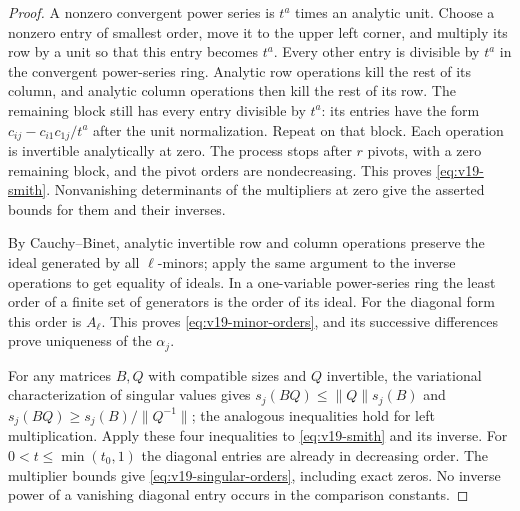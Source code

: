 \begin{proof}
A nonzero convergent power series is $t^a$ times an analytic unit.
Choose a nonzero entry of smallest order, move it to the upper left
corner, and multiply its row by a unit so that this entry becomes
$t^a$. Every other entry is divisible by $t^a$ in the convergent
power-series ring. Analytic row operations kill the rest of its
column, and analytic column operations then kill the rest of its row.
The remaining block still has every entry divisible by $t^a$:
its entries have the form $c_{ij}-c_{i1}c_{1j}/t^a$ after the unit
normalization. Repeat on that block. Each operation is invertible
analytically at zero. The process stops after $r$ pivots, with a zero
remaining block, and the pivot orders are nondecreasing. This proves
\eqref{eq:v19-smith}. Nonvanishing determinants of the multipliers
at zero give the asserted bounds for them and their inverses.

By Cauchy--Binet, analytic invertible row and column operations
preserve the ideal generated by all $\ell$-minors; apply the same
argument to the inverse operations to get equality of ideals.
In a one-variable power-series ring the least order of a finite
set of generators is the order of its ideal. For the diagonal form
this order is $A_\ell$. This proves \eqref{eq:v19-minor-orders},
and its successive differences prove uniqueness of the $\alpha_j$.

For any matrices $B,Q$ with compatible sizes and $Q$ invertible,
the variational characterization of singular values gives
$s_j(BQ)\le\|Q\|s_j(B)$ and
$s_j(BQ)\ge s_j(B)/\|Q^{-1}\|$; the analogous inequalities hold
for left multiplication. Apply these four inequalities to
\eqref{eq:v19-smith} and its inverse. For $0<t\le\min(t_0,1)$
the diagonal entries are already in decreasing order. The multiplier
bounds give \eqref{eq:v19-singular-orders}, including exact zeros.
No inverse power of a vanishing diagonal entry occurs in the
comparison constants.
\end{proof}

